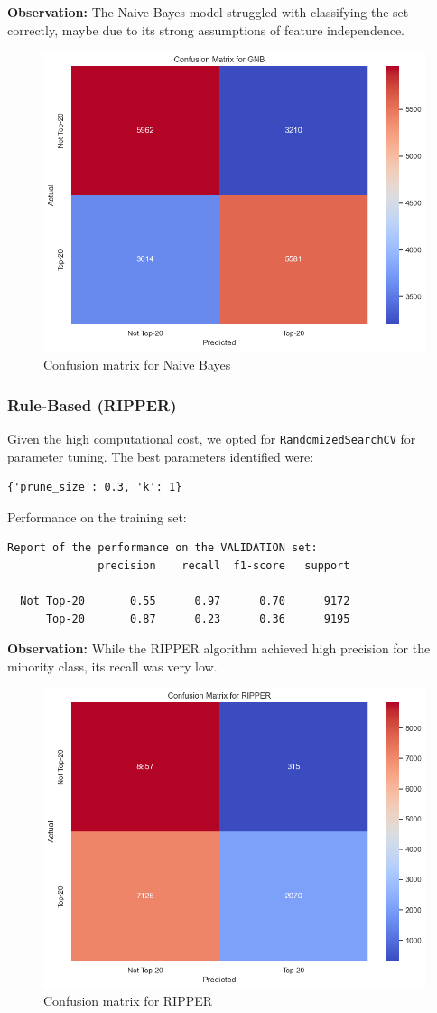 \documentclass{article}
\begin{document}
\textbf{Observation:} The Naive Bayes model struggled with classifying the set correctly, maybe due to its strong assumptions of feature independence.

\begin{figure}[H]
    \centering
    \includegraphics[width=0.5\linewidth]{gnb.png}
    \caption{Confusion matrix for Naive Bayes}
    \label{fig:enter-label}
\end{figure}


\subsubsection{Rule-Based (RIPPER)}
Given the high computational cost, we opted for \texttt{RandomizedSearchCV} for parameter tuning. The best parameters identified were:
\begin{verbatim}
{'prune_size': 0.3, 'k': 1}
\end{verbatim}

Performance on the training set:
\begin{verbatim}
Report of the performance on the VALIDATION set:
              precision    recall  f1-score   support

  Not Top-20       0.55      0.97      0.70      9172
      Top-20       0.87      0.23      0.36      9195
\end{verbatim}

\textbf{Observation:} While the RIPPER algorithm achieved high precision for the minority class, its recall was very low.


\begin{figure}[H]
    \centering
    \includegraphics[width=0.5\linewidth]{confusion_ripper.png}
    \caption{Confusion matrix for RIPPER}
    \label{fig:enter-label}
\end{figure}
\end{document}
